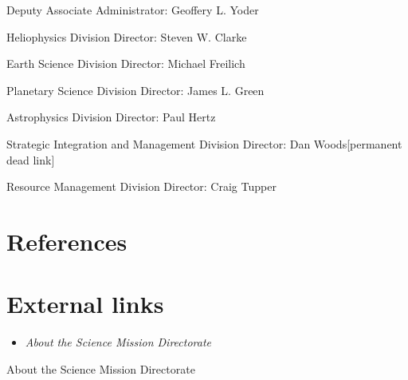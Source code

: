 Deputy Associate Administrator: Geoffery L. Yoder

Heliophysics Division Director: Steven W. Clarke

Earth Science Division Director: Michael Freilich

Planetary Science Division Director: James L. Green

Astrophysics Division Director: Paul Hertz

Strategic Integration and Management Division Director: Dan
Woods{[}permanent dead link{]}

Resource Management Division Director: Craig Tupper

\section{References}\label{references}

\section{External links}\label{external-links}

\begin{itemize}
\item
  \emph{About the Science Mission Directorate}
\end{itemize}

About the Science Mission Directorate
